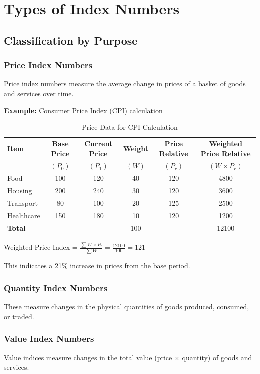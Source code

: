 \documentclass[twoside]{book}
\begin{document}
\section{Types of Index Numbers}

\subsection{Classification by Purpose}

\subsubsection{Price Index Numbers}
Price index numbers measure the average change in prices of a basket of goods and services over time.

\textbf{Example:} Consumer Price Index (CPI) calculation

\begin{table}[h]
\centering
\caption{Price Data for CPI Calculation}
\begin{tabular}{lccccc}
\toprule
\textbf{Item} & \textbf{Base Price} & \textbf{Current Price} & \textbf{Weight} & \textbf{Price Relative} & \textbf{Weighted Price Relative} \\
 & $(P_0)$ & $(P_1)$ & $(W)$ & $(P_r)$ & $(W \times P_r)$ \\
\midrule
Food & 100 & 120 & 40 & 120 & 4800 \\
Housing & 200 & 240 & 30 & 120 & 3600 \\
Transport & 80 & 100 & 20 & 125 & 2500 \\
Healthcare & 150 & 180 & 10 & 120 & 1200 \\
\midrule
\textbf{Total} & & & 100 & & 12100 \\
\bottomrule
\end{tabular}
\end{table}

Weighted Price Index = $\frac{\sum W \times P_r}{\sum W} = \frac{12100}{100} = 121$

This indicates a 21\% increase in prices from the base period.

\subsubsection{Quantity Index Numbers}
These measure changes in the physical quantities of goods produced, consumed, or traded.

\subsubsection{Value Index Numbers}
Value indices measure changes in the total value (price × quantity) of goods and services.
\end{document}
